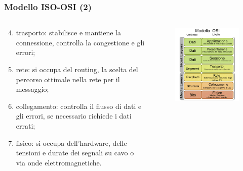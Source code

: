 \documentclass[]{beamer}
\begin{document}
\begin{frame}
\frametitle{Modello ISO-OSI (2)}
\begin{columns}
\begin{column}{.55\textwidth}
  \begin{enumerate}\setcounter{enumi}{3}
    \item \alert<1>{trasporto}: stabilisce e mantiene la connessione, controlla la congestione e gli errori;\pause
    \item \alert<2>{rete}: si occupa del routing, la scelta del percorso ottimale nella rete per il messaggio;\pause
    \item \alert<3>{collegamento}: controlla il flusso di dati e gli errori, se necessario richiede i dati errati;\pause
    \item \alert<4>{fisico}: si occupa dell’hardware, delle tensioni e durate dei segnali su cavo o via onde elettromagnetiche.
  \end{enumerate}
\end{column}
\begin{column}{.45\textwidth}
  \begin{figure}
    \includegraphics[width=\columnwidth]{img/isoosi.png}
  \end{figure}
\end{column}
\end{columns}
\end{frame}
\end{document}
